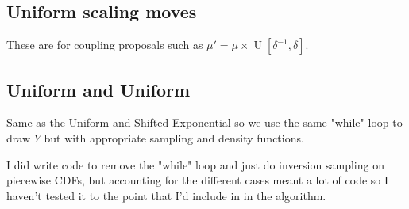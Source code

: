 \documentclass[11pt,a4paper]{article}
\DeclareMathOperator*{\Unif}{\mathrm{U}}
\begin{document}


\subsection{Uniform scaling moves}

These are for coupling proposals such as $ \mu' = \mu \times \Unif[\delta^{-1}, \delta] $.



\subsection{Uniform and Uniform}

Same as the Uniform and Shifted Exponential so we use the same "while" loop to draw $ Y $ but with appropriate sampling and density functions.

I did write code to remove the "while" loop and just do inversion sampling on piecewise CDFs, but accounting for the different cases meant a lot of code so I haven't tested it to the point that I'd include in in the algorithm.

%
%
\end{document}
